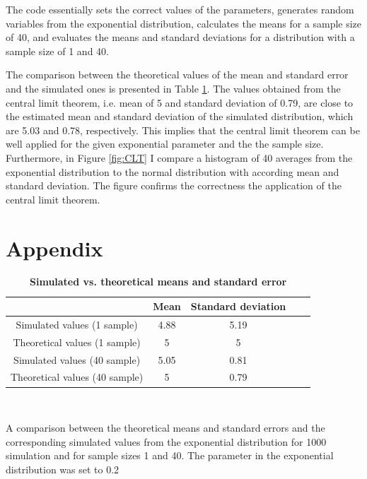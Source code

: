 \documentclass[a4paper,12pt]{article}
\begin{document}
The code essentially sets the correct values of the parameters, generates random variables from the exponential distribution, calculates the means for a sample size of 40, and evaluates the means and standard deviations for a distribution with a sample size of 1 and 40.

The comparison between the theoretical values of the mean and standard error and the simulated ones is presented in Table \ref{tab:CLT}. The values obtained from the central limit theorem, i.e. mean of 5 and standard deviation of 0.79, are close to the estimated mean and standard deviation of the simulated distribution, which are 5.03 and 0.78, respectively. This implies that the central limit theorem can be well applied for the given exponential parameter and the the sample size. Furthermore, in Figure \ref{fig:CLT} I compare a histogram of 40 averages from the exponential distribution to the normal distribution with according mean and standard deviation. The figure confirms the correctness the application of the central limit theorem.

\newpage
\section{Appendix}

 \begin{table}[!h]
\begin{center}
\caption {\label{tab:CLT} \textbf{Simulated vs. theoretical means and standard error}}
\vspace{0.2 cm}
{\begin{tabular}{|c|c|c|c|c|}
\hline   &  Mean & Standard deviation  \\
\hline           
 Simulated values (1 sample) & 4.88 &  5.19    \\
 Theoretical values (1 sample)    & 5 & 5   \\ 
 \hline     
 Simulated values (40 sample) & 5.05 &  0.81    \\
 Theoretical values (40 sample)    & 5 & 0.79   \\ 
\hline 
\end{tabular} }
 \\
 \vspace{0. cm}
\end{center}
 A comparison between the theoretical means and standard errors and the corresponding simulated values from the exponential distribution for 1000 simulation and for sample sizes 1 and 40. The parameter in the exponential distribution was set to 0.2
\end{table} 
\end{document}
